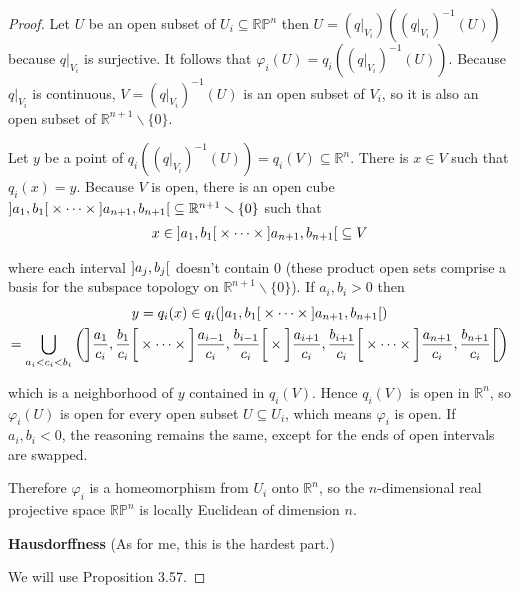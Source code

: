 \begin{proof}
    Let $U$ be an open subset of $U_{i} \subseteq \mathbb{RP}^{n}$ then $U = (q\vert_{V_{i}})({(q\vert_{V_{i}})}^{-1}(U))$ because $q\vert_{V_{i}}$ is surjective. It follows that $\varphi_{i}(U) = q_{i}({(q\vert_{V_{i}})}^{-1}(U))$. Because $q\vert_{V_{i}}$ is continuous, $V = {(q\vert_{V_{i}})}^{-1}(U)$ is an open subset of $V_{i}$, so it is also an open subset of $\mathbb{R}^{n+1}\smallsetminus\{ 0 \}$.

    Let $y$ be a point of $q_{i}({(q\vert_{V_{i}})}^{-1}(U)) = q_{i}(V) \subseteq \mathbb{R}^{n}$. There is $x\in V$ such that $q_{i}(x) = y$. Because $V$ is open, there is an open cube $\left]{a_{1}, b_{1}}\right[\times\cdots\times\left]{a_{n+1}, b_{n+1}}\right[ \subseteq \mathbb{R}^{n+1}\smallsetminus\{0\}$ such that
    \begin{align*}
        x \in \left]{a_{1}, b_{1}}\right[\times\cdots\times\left]{a_{n+1}, b_{n+1}}\right[ \subseteq V
    \end{align*}

    where each interval $\left]{a_{j}, b_{j}}\right[$ doesn't contain $0$ (these product open sets comprise a basis for the subspace topology on $\mathbb{R}^{n+1}\smallsetminus\{0\}$). If $a_{i}, b_{i} > 0$ then
    \begin{multline*}
        y = q_{i}(x) \in q_{i}(\left]{a_{1}, b_{1}}\right[\times\cdots\times\left]{a_{n+1}, b_{n+1}}\right[) \\
        = \bigcup_{a_{i} < c_{i} < b_{i}}\left(\left]{\frac{a_{1}}{c_{i}}, \frac{b_{1}}{c_{i}}}\right[ \times \cdots \times \left]{\frac{a_{i-1}}{c_{i}}, \frac{b_{i-1}}{c_{i}}}\right[ \times \left]{\frac{a_{i+1}}{c_{i}}, \frac{b_{i+1}}{c_{i}}}\right[ \times \cdots \times \left]{\frac{a_{n+1}}{c_{i}}, \frac{b_{n+1}}{c_{i}}}\right[\right)
    \end{multline*}

    which is a neighborhood of $y$ contained in $q_{i}(V)$. Hence $q_{i}(V)$ is open in $\mathbb{R}^{n}$, so $\varphi_{i}(U)$ is open for every open subset $U\subseteq U_{i}$, which means $\varphi_{i}$ is open. If $a_{i}, b_{i} < 0$, the reasoning remains the same, except for the ends of open intervals are swapped.

    Therefore $\varphi_{i}$ is a homeomorphism from $U_{i}$ onto $\mathbb{R}^{n}$, so the $n$-dimensional real projective space $\mathbb{RP}^{n}$ is locally Euclidean of dimension $n$.

    \textbf{Hausdorffness} (As for me, this is the hardest part.)

    We will use Proposition 3.57.


\end{proof}
